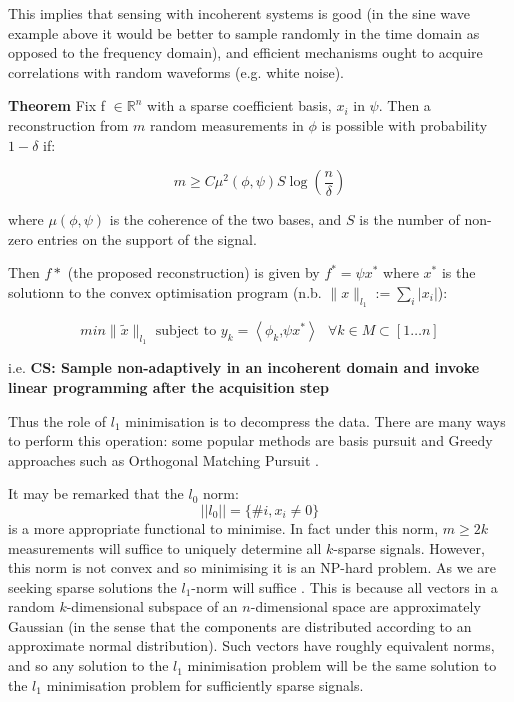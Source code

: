 \documentclass[conference]{IEEEtran}
\newcommand{\vectornorm}[1]{\left|\left|#1\right|\right|}
\begin{document}
This implies that sensing with incoherent systems is good (in the sine wave example above it would be better to sample randomly in the time domain as opposed to the frequency domain), and efficient mechanisms ought to acquire correlations with random waveforms (e.g. white noise).

\textbf{Theorem} \cite{Candes2006}
Fix f \(\in \mathbb{R}^n\) with a sparse coefficient basis, \(x_{i}\) in \(\psi\). Then a reconstruction from \(m\) random measurements in \(\phi\) is possible with probability \(1 - \delta\) if: 

\begin{equation}
m \geq C \mu^2(\phi, \psi) S \log\left(\frac{n}{\delta}\right)
\end{equation}
\label{minsamples}

where \( \mu(\phi, \psi)\) is the coherence of the two bases, and \(S\) is the number of non-zero entries on the support of the signal.

Then \(f*\) (the proposed reconstruction) is given by \(f^* = \psi x^*\) where \(x^*\) is the solutionn to the convex optimisation program (n.b. \(\| x\|_{l_{1}} := \sum_{i} |x_{i}| \)):

\begin{equation}
min\|\tilde{x}\|_{l_{1}} \text{ subject to } y_{k} = \left\langle \phi_{k} \text{,} \psi x^* \right\rangle \text{   } \forall k \in M \subset [1 \ldots n]
\end{equation}
\label{program0}

i.e. \textbf{CS: Sample non-adaptively in an incoherent domain and invoke linear programming after the acquisition step}

Thus the role of \(l_{1}\) minimisation is to decompress the data. There are many ways to perform this operation: some popular methods are basis pursuit \cite{Chen1998} and Greedy approaches such as Orthogonal Matching Pursuit \cite{Tropp2007}. 

It may be remarked that the \(l_0\) norm:
%
\begin{equation}
\vectornorm{l_0} = \{\# i, x_i \neq 0\}
\end{equation}
%
is a more appropriate functional to minimise. In fact under this norm, \(m \geq 2k\) measurements will suffice to uniquely determine all \(k\)-sparse signals. However, this norm is not convex and so minimising it is an NP-hard problem. As we are seeking sparse solutions the \(l_1\)-norm will suffice \cite{Donoho2006a}. This is because all vectors in a random \(k\)-dimensional subspace of an \(n\)-dimensional space are approximately Gaussian (in the sense that the components are distributed according to an approximate normal distribution). Such vectors have roughly equivalent norms, and so any solution to the \(l_1\) minimisation problem will be the same solution to the \(l_1\) minimisation problem for sufficiently sparse signals.
\end{document}
